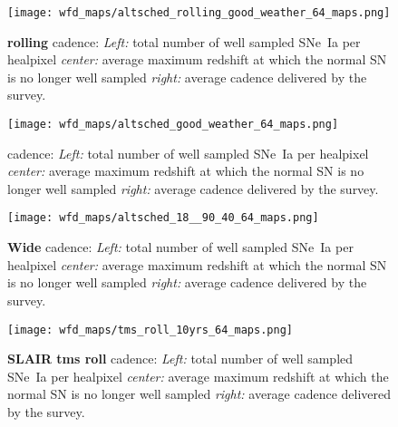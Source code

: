 

\begin{figure}[h!]
  \begin{center}
    \texttt{[image: wfd\_maps/altsched\_rolling\_good\_weather\_64\_maps.png]}
    \caption{ {\bf \altsched rolling} cadence: {\em Left:} total number
      of well sampled SNe~Ia per healpixel {\em center:} average
      maximum redshift at which the normal SN is no longer well
      sampled {\em right:} average cadence delivered by the survey.}
    \label{fig:altsched_rolling_good_weather}
  \end{center}
\end{figure}


\begin{figure}[h!]
  \begin{center}
    \texttt{[image: wfd\_maps/altsched\_good\_weather\_64\_maps.png]}
    \caption{ {\bf \altsched} cadence: {\em Left:} total number of well
      sampled SNe~Ia per healpixel {\em center:} average maximum
      redshift at which the normal SN is no longer well sampled {\em
        right:} average cadence delivered by the survey.}
    \label{fig:altsched_good_weather}
  \end{center}
\end{figure}

\begin{figure}[h!]
  \begin{center}
    \texttt{[image: wfd\_maps/altsched\_18\_\_90\_40\_64\_maps.png]}
    \caption{{\bf \altsched Wide} cadence: {\em Left:} total number of well
      sampled SNe~Ia per healpixel {\em center:} average maximum
      redshift at which the normal SN is no longer well sampled {\em
        right:} average cadence delivered by the survey.}
  \end{center}
  \label{fig:altsched_wide}
\end{figure}

\begin{figure}[h!]
  \begin{center}
    \texttt{[image: wfd\_maps/tms\_roll\_10yrs\_64\_maps.png]}
    \caption{{\bf SLAIR tms roll} cadence: {\em Left:} total number of well
      sampled SNe~Ia per healpixel {\em center:} average maximum
      redshift at which the normal SN is no longer well sampled {\em
        right:} average cadence delivered by the survey.}
    \label{fig:tms_roll}
  \end{center}
\end{figure}

